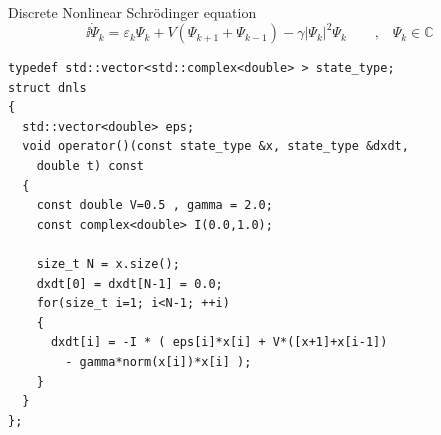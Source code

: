 \begin{frame}[fragile]

 \vspace{2ex}

 Discrete Nonlinear Schr\"odinger equation
$$
  \ii \dot{\Psi}_k = \varepsilon_k \Psi_k + V( \Psi_{k+1}+\Psi_{k-1}) - \gamma |\Psi_k|^2 \Psi_k
  \quad \quad \text{,} \quad \Psi_k \in \mathbb{C}
$$
 

 \begin{lstlisting}[basicstyle=\scriptsize\ttfamily]
typedef std::vector<std::complex<double> > state_type;
struct dnls
{
  std::vector<double> eps;
  void operator()(const state_type &x, state_type &dxdt,
    double t) const
  {
    const double V=0.5 , gamma = 2.0;
    const complex<double> I(0.0,1.0);

    size_t N = x.size();
    dxdt[0] = dxdt[N-1] = 0.0;
    for(size_t i=1; i<N-1; ++i)
    {
      dxdt[i] = -I * ( eps[i]*x[i] + V*([x+1]+x[i-1])
        - gamma*norm(x[i])*x[i] );
    }
  }
};
 \end{lstlisting}

\end{frame}

